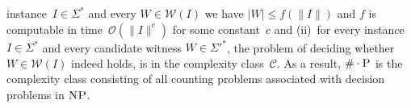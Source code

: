 \documentclass{svproc}
\newcommand{\bigO}[1]{\ensuremath{{\mathcal O}(#1)}}
\newcommand{\CCard}[1]{\|#1\|}
\newcommand{\Card}[1]{\left|#1\right|}
\renewcommand{\P}{\ensuremath{\textsc{P}}\xspace}
\newcommand{\NP}{\ensuremath{\textsc{NP}}\xspace}
\newcommand{\WWW}{\ensuremath{\mathcal{W}}}%
\newcommand{\mtext}[1]{\ensuremath{\mathcal{#1}}}
\newcommand{\cnt}[0]{\ensuremath{\#}}
\newcommand{\cntc}[0]{\ensuremath{\cnt\cdot}}
\begin{document}
instance~$I \in \Sigma^*$ and every $W \in \WWW(I)$ we have
$\Card{W} \leq f(\CCard{I})$ and $f$ is computable in
time~$\bigO{\CCard{I}^c}$ for some constant~$c$ and (ii)~for every
instance~$I \in \Sigma^*$ and every candidate witness $W \in {\Sigma'}^*$, the problem of deciding whether~$W\in\WWW(I)$ indeed holds, is in the complexity class~$\mtext{C}$.
As a result, $\cntc\P$ is the complexity class consisting of all counting
problems associated with decision problems in \NP.
%
%
\end{document}
